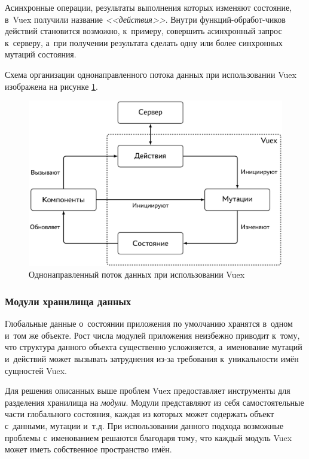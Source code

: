 Асинхронные операции, результаты выполнения которых изменяют состояние, в~Vuex получили название \emph{<<действия>>}. Внутри функций-обработ-чиков действий становится возможно, к~примеру, совершить асинхронный запрос к~серверу, а~при получении результата сделать одну или более синхронных мутаций состояния.

Схема организации однонаправленного потока данных при использовании Vuex изображена на рисунке \ref{fig:vuex-oneway-data-flow}.

\begin{figure}[h!]
  \centering
  \setlength{\fboxsep}{5pt}
  \includegraphics[width=.9\textwidth]{img/tikz/vuex-oneway-data-flow/pic}
  \vspace*{12pt}
  \caption{Однонаправленный поток данных при использовании Vuex}\label{fig:vuex-oneway-data-flow}
\end{figure}


\subsubsection{Модули хранилища данных}

Глобальные данные о~состоянии приложения по умолчанию хранятся в~одном и~том же объекте. Рост числа модулей приложения неизбежно приводит к~тому, что структура данного объекта существенно усложняется, а~именование мутаций и~действий может вызывать затруднения из-за требования к~уникальности имён сущностей Vuex.

Для решения описанных выше проблем Vuex предоставляет инструменты для разделения хранилища на \emph{модули}. Модули представляют из себя самостоятельные части глобального состояния, каждая из которых может содержать объект с~данными, мутации и~т.д. При использовании данного подхода возможные проблемы с~именованием решаются благодаря тому, что каждый модуль Vuex может иметь собственное пространство имён.

